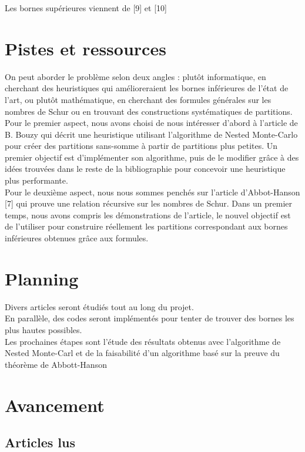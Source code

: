 \documentclass{report}
\begin{document}
Les bornes supérieures viennent de [9] et [10]

\section{Pistes et ressources}

On peut aborder le problème selon deux angles : plutôt informatique, en cherchant des heuristiques qui amélioreraient les bornes inférieures de l'état de l'art, ou plutôt mathématique, en cherchant des formules générales sur les nombres de Schur ou en trouvant des constructions systématiques de partitions.
\\
Pour le premier aspect, nous avons choisi de nous intéresser d'abord à l'article de B. Bouzy qui décrit une heuristique utilisant l'algorithme de Nested Monte-Carlo pour créer des partitions sans-somme à partir de partitions plus petites. Un premier objectif est d'implémenter son algorithme, puis de le modifier grâce à des idées trouvées dans le reste de la bibliographie pour concevoir une heuristique plus performante.
\\
Pour le deuxième aspect, nous nous sommes penchés sur l'article d'Abbot-Hanson [7] qui prouve une relation récursive sur les nombres de Schur. Dans un premier temps, nous avons compris les démonstrations de l'article, le nouvel objectif est de l'utiliser pour construire réellement les partitions correspondant aux bornes inférieures obtenues grâce aux formules.

\section{Planning}

Divers articles seront étudiés tout au long du projet.
\\ En parallèle, des codes seront implémentés pour tenter de trouver des bornes les plus hautes possibles.
\\ Les prochaines étapes sont l'étude des résultats obtenus avec l'algorithme de Nested Monte-Carl et de la faisabilité d'un algorithme basé sur la preuve du théorème de Abbott-Hanson 

\section{Avancement}

\subsection{Articles lus}
\end{document}
